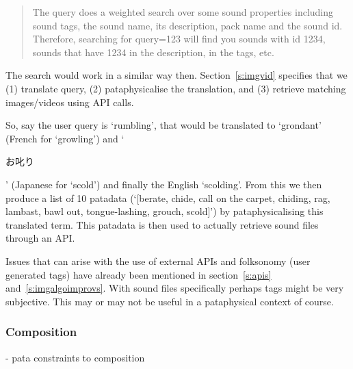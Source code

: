 \documentclass[11pt]{thesis} %
\begin{document}
\begin{quotation}
  The query does a weighted search over some sound properties including sound tags, the sound name, its description, pack name and the sound id. Therefore, searching for query=123 will find you sounds with id 1234, sounds that have 1234 in the description, in the tags, etc. 
\end{quotation}

The search would work in a similar way then. Section~\ref{s:imgvid} specifies that we (1) translate query, (2) pataphysicalise the translation, and (3) retrieve matching images/videos using \ac{API} calls.

So, say the user query is `rumbling', that would be translated to `grondant' (French for `growling') and `\begin{CJK}{UTF8}{min}お叱り\end{CJK}' (Japanese for `scold') and finally the English `scolding'. From this we then produce a list of 10 patadata (`[berate, chide, call on the carpet, chiding, rag, lambast, bawl out, tongue-lashing, grouch, scold]') by pataphysicalising this translated term. This patadata is then used to actually retrieve sound files through an \ac{API}.

Issues that can arise with the use of external \ac{API}s and folksonomy (user generated tags) have already been mentioned in section~\ref{s:apis} and~\ref{s:imgalgoimprovs}. With sound files specifically perhaps tags might be very subjective. This may or may not be useful in a pataphysical context of course.


\subsubsection{Composition}
\label{s:composition}

- pata constraints to composition
\end{document}
